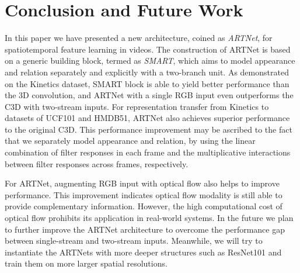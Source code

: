 \documentclass[10pt,twocolumn,letterpaper]{article}
\begin{document}
\section{Conclusion and Future Work}
\vspace{-1mm}

In this paper we have presented a new architecture, coined as {\em ARTNet}, for spatiotemporal feature learning in videos. The construction of ARTNet is based on a generic building block, termed as {\em SMART}, which aims to model appearance and relation separately and explicitly with a two-branch unit. As demonstrated on the Kinetics dataset, SMART block is able to yield better performance than the 3D convolution, and ARTNet with a single RGB input even outperforms the C3D with two-stream inputs. For representation transfer from Kinetics to datasets of UCF101 and HMDB51, ARTNet also achieves superior performance to the original C3D. This performance improvement may be ascribed to the fact that we separately model appearance and relation, by using the linear combination of filter responses in each frame and the multiplicative interactions between filter responses across frames, respectively.

For ARTNet, augmenting RGB input with optical flow also helps to improve performance. This improvement indicates optical flow modality is still able to provide complementary information. However, the high computational cost of optical flow prohibits its application in real-world systems. In the future we plan to further improve the ARTNet architecture to overcome the performance gap between single-stream and two-stream inputs. Meanwhile, we will try to instantiate the ARTNets with more deeper structures such as ResNet101 and train them on more larger spatial resolutions.




{\small


}
\end{document}
